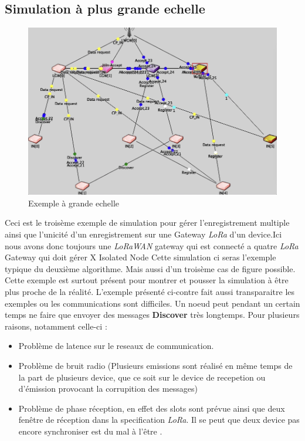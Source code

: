 \subsection{Simulation à plus grande echelle }
\begin{figure}[!ht]
\centering
\includegraphics[scale=0.45]{fat.png} 
\caption{Exemple à grande echelle}
\end{figure}
Ceci est le troisème exemple de simulation pour gérer l'enregistrement multiple ainsi que l'unicité d'un enregistrement sur une Gateway \textit{LoRa} d'un device.Ici nous avons donc toujours une  \textit{LoRaWAN} gateway qui est connecté a quatre \textit{LoRa} Gateway qui doit gérer X Isolated Node Cette simulation ci seras l'exemple typique du deuxième algorithme. Mais aussi d'un troisème cas de figure possible. Cette exemple est surtout présent pour montrer et pousser la simulation à être plus proche de la réalité.
L'exemple présenté ci-contre fait aussi transparaitre les exemples ou les communications sont difficiles. Un noeud peut pendant un certain temps ne faire que envoyer des messages \textbf{Discover} très longtemps. Pour plusieurs raisons, notamment celle-ci : 
\begin{itemize}
\item Problème de latence sur le reseaux de communication. 
\item Problème de bruit radio (Plusieurs emissions sont réalisé en même temps de la part de plusieurs device, que ce soit sur le device de recepetion ou d'émission provocant la corrupition des messages)
\item Problème de phase réception, en effet des slots sont prévue ainsi que deux fenêtre de réception dans la specification \textit{LoRa}. Il se peut que deux device pas encore synchroniser est du mal à l'être .
\end{itemize}

